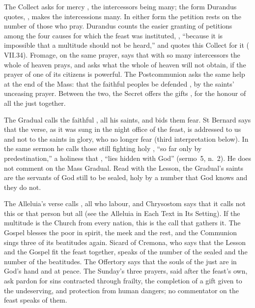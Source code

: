The Collect asks for mercy , the
intercessors being many; the form Durandus quotes, , makes the intercessions many. In either form the petition
rests on the number of those who pray. Durandus counts the easier granting of
petitions among the four causes for which the feast was instituted,
, ``because it is
impossible that a multitude should not be heard,'' and quotes this Collect for
it ( VII.34). Fromage, on the same prayer, says that with so
many intercessors the whole of heaven prays, and asks what the whole of heaven
will not obtain, if the prayer of one of its citizens is powerful. The
Postcommunion asks the same help at the end of the Mass: that the faithful
peoples be defended , by the saints' unceasing
prayer. Between the two, the Secret offers the gifts , for the honour of all the just together.

The Gradual calls the faithful , all his saints, and
bids them fear. St Bernard says that the verse, as it was sung in the night
office of the feast, is addressed to us and not to the saints in glory, who no
longer fear (third interpretation below). In the same sermon he calls those
still fighting holy , ``so far only
by predestination,'' a holiness that , ``lies
hidden with God'' (sermo~5, n.~2). He does not comment on the Mass Gradual.
Read with the Lesson, the Gradual's saints are the servants of God still to be
sealed, holy by a number that God knows and they do not.

The Alleluia's verse calls , all who labour, and
Chrysostom says that it calls not this or that person but all (see the
Alleluia in Each Text in Its Setting). If the multitude is the Church from
every nation, this is the call that gathers it. The Gospel blesses the poor in
spirit, the meek and the rest, and the Communion sings three of its
beatitudes again. Sicard of Cremona, who says that the Lesson and the Gospel
fit the feast together, speaks of the number of the sealed and the number of
the beatitudes. The Offertory says that the souls of the just are in God's
hand and at peace. The Sunday's three prayers, said after the feast's own,
ask pardon for sins contracted through frailty, the completion of a gift
given to the undeserving, and protection from human dangers; no commentator
on the feast speaks of them.

